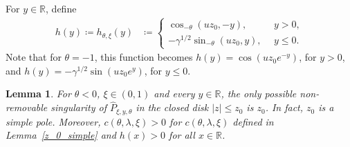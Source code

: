 \documentclass[10pt,a4paper]{amsart}
\newcommand{\R}{\mathbb{R}} %
\newcommand{\1}{\mathds{1}}
\newtheorem{Lemma}[definition]{Lemma}
\begin{document}
For $y\in\R$, define
\begin{align}\label{def_eigenfunction_neg_theta}
    h(y)\coloneqq h_{\theta,\xi}(y)&\coloneqq
   \begin{cases}
       \cos_{-\theta}\left(u z_0,-y\right) ,~~&y>0,
        \\-\gamma^{1/2}\sin_{-\theta}\left(u z_0,y\right),~~&y\le 0.
    \end{cases}
\end{align}
Note that for $\theta=-1$, this function becomes $h(y)=\cos\left(u z_0e^{-y}\right)$, for $y>0$, and $h(y)=-\gamma^{1/2}\sin\left(u z_0e^y\right)$, for $y\le 0$.

\begin{Lemma}\label{h_pos_thetale-1}
     For $\theta<0$, $\xi\in(0,1)$ and every $y\in\R$, the only possible non-removable
singularity of $\hat P_{\xi,y,\theta}$ in the closed disk
$|z|\le z_0$ is $z_0$. In fact, $z_0$ is a simple pole. Moreover, $c(\theta,\lambda,\xi)>0$ for $c(\theta,\lambda,\xi)$ defined in Lemma~\ref{z_0_simple} and $h(x)>0$ for all $x\in\R$. 
\end{Lemma}
\end{document}
